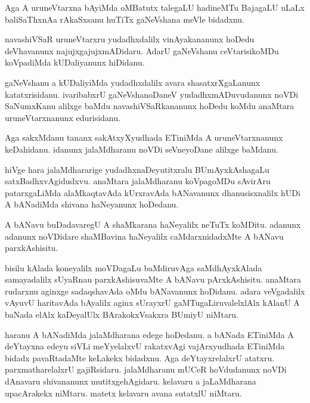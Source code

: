 \documentclass{article}
\begin{document}
\begin{mn}%
Aga A uruneVtarxna bAyiMda oMBatutx talegaLU hadineMTu BajagaLU uLaLx baliSaThxnAa 
rAkaSxsanu huTiTx gaNeVshana meVle bidadxnu.
\end{mn}

\begin{mn}%
navashiVSaR uruneVtarxru yudadhxdalilx vinAyakananunx hoDedu deVhavanunx 
najujxgajujxmADidaru. AdarU gaNeVshanu ceVtarisikoMDu  koVpadiMda kUDaliyanunx hiDidanu.
\end{mn}

\begin{mn}%
gaNeVshanu a kUDaliyiMda yudadhxdalilx avara shasatxrXgaLanunx katatxrisidanu. ivaribabxrU 
gaNeVshanoDaneV yudadhxmADuvudanunx noVDi SaNumxKanu alilxge baMdu navashiVSaRkananunx 
hoDedu koMdu anaMtara uruneVtarxnanunx edurisidanu.
\end{mn}

\begin{mn}%
Aga sakxMdanu tananx sakAtxyXyudhada ETiniMda A uruneVtarxnanunx keDahidanu. idanunx 
jalaMdharanu noVDi seVneyoDane alilxge baMdanu.
\end{mn}

\begin{mn}%
hiVge hara jalaMdhararige yudadhxnaDeyutitxralu BUmAyxkAshagaLu satxBadhxvAgidudxvu. 
anaMtara jalaMdharanu koVpagoMDu sAvirAru patarxgaLiMda alaMkaqtavAda kUrxravAda bANavanunx 
dhanusisxnalilx hUDi A bANadiMda shivana haNeyanunx hoDedanu.
\end{mn}

\begin{mn}%
A bANavu buDadavaregU A shaMkarana haNeyalilx neTuTx koMDitu. adanunx adanunx noVDidare 
shaMBavina haNeyalilx caMdarxnidadxMte A bANavu parxkAshisitu.
\end{mn}

\begin{mn}%
bisilu kAlada koneyalilx moVDagaLu baMdiruvAga saMdhAyxkAlada samayadalilx sUyaRnau 
parxkAshisuvaMte A bANavu pArxkAshisitu. anaMtara rudarxnu aginxge sadaqshavAda oMdu 
bANavanunx hoDidanu. adara veVgadalilx vAyuvU haritavAda bAyalilx aginx sUrayxrU 
gaMTugaLiruvalelxlAlx kAlanU A baNada elAlx kaDeyalUlx BArakokxVsakxra BUmiyU niMtaru.
\end{mn}

\begin{mn}%
haranu A bANadiMda jalaMdharana edege hoDedanu. a bANada ETiniMda A deYtayxna edeyu siVLi 
meYyelalxvU rakatxvAgi vajArxyudhada ETiniMda bidadx pavaRtadaMte keLakekx bidadxnu. Aga 
deYtayxrelalxrU atatxru. parxmatharelalxrU gajiRsidaru. jalaMdharanu mUCeR hoVdudanunx 
noVDi dAnavaru shivananunx mutitxgehAgidaru. kelavaru a jaLaMdharana upacArakekx niMtaru. 
matetx kelavaru avana sutatxlU niMtaru.
\end{mn}
\end{document}
